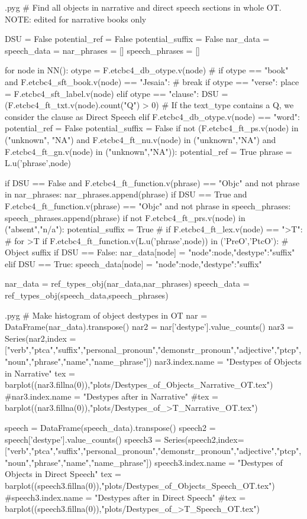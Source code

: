 \documentclass{report}
\makeatletter
\newenvironment{python}{%
  \VerbatimEnvironment
  \minted@resetoptions
  \setkeys{minted@opt}{}
      \begin{VerbatimOut}{\jobname.pyg}}
{%
      \end{VerbatimOut}
      \minted@pygmentize{python}
      \DeleteFile{\jobname.pyg}}
\makeatother
\begin{document}
\begin{python}
# Find all objects in narrative and direct speech sections in whole OT. NOTE: edited for narrative books only

DSU = False
potential_ref = False
potential_suffix = False
nar_data = {}
speech_data = {}
nar_phrases = []
speech_phrases = []

for node in NN():
    otype = F.etcbc4_db_otype.v(node)
#    if otype == "book" and F.etcbc4_sft_book.v(node) == "Jesaia":
#        break
    if otype == "verse":
        place = F.etcbc4_sft_label.v(node)
    elif otype == "clause":
        DSU = (F.etcbc4_ft_txt.v(node).count("Q") > 0)    # If the text_type contains a Q, we consider the clause as Direct Speech
    elif F.etcbc4_db_otype.v(node) == "word":
        potential_ref = False
        potential_suffix = False
        if not (F.etcbc4_ft_ps.v(node) in ("unknown", "NA") and F.etcbc4_ft_nu.v(node) in ("unknown","NA") and F.etcbc4_ft_gn.v(node) in ("unknown","NA")):
            potential_ref = True
            phrase = L.u('phrase',node)
            
            if DSU == False and F.etcbc4_ft_function.v(phrase) == "Objc" and not phrase in nar_phrases:
                nar_phrases.append(phrase)
            if DSU == True and F.etcbc4_ft_function.v(phrase) == "Objc" and not phrase in speech_phrases:
                speech_phrases.append(phrase) 
        if not F.etcbc4_ft_prs.v(node) in ("absent","n/a"):
            potential_suffix = True
#            if F.etcbc4_ft_lex.v(node) == ">T": # for >T
            if F.etcbc4_ft_function.v(L.u('phrase',node)) in ('PreO','PtcO'): # Object suffix
                if DSU == False:
                    nar_data[node] = {"node":node,"destype":"suffix"}
                elif DSU == True:
                    speech_data[node] = {"node":node,"destype":"suffix"}

nar_data = ref_types_obj(nar_data,nar_phrases)
speech_data = ref_types_obj(speech_data,speech_phrases)

\end{python}

\begin{python}
# Make histogram of object destypes in OT
nar = DataFrame(nar_data).transpose()
nar2 = nar['destype'].value_counts()
nar3 = Series(nar2,index = ["verb","ptca","suffix","personal_pronoun","demonstr_pronoun","adjective","ptcp","noun","phrase","name","name_phrase"])
nar3.index.name = "Destypes of Objects in Narrative"
tex = barplot((nar3.fillna(0)),"plots/Destypes_of_Objects_Narrative_OT.tex")
#nar3.index.name = "Destypes after  in Narrative"
#tex = barplot((nar3.fillna(0)),"plots/Destypes_of_>T_Narrative_OT.tex")


speech = DataFrame(speech_data).transpose()
speech2 = speech['destype'].value_counts()
speech3 = Series(speech2,index=["verb","ptca","suffix","personal_pronoun","demonstr_pronoun","adjective","ptcp","noun","phrase","name","name_phrase"])
speech3.index.name = "Destypes of Objects in Direct Speech"
tex = barplot((speech3.fillna(0)),"plots/Destypes_of_Objects_Speech_OT.tex")
#speech3.index.name = "Destypes after  in Direct Speech"
#tex = barplot((speech3.fillna(0)),"plots/Destypes_of_>T_Speech_OT.tex")
\end{python}
\end{document}
